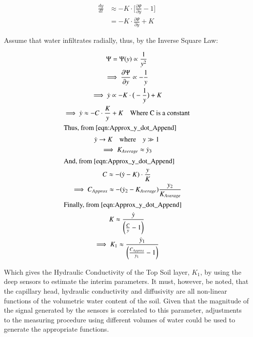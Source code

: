 \begin{align}
    \frac{dy}{dt} &\approx -K\cdot \bigg[\frac{\partial \Psi}{\partial y}-1\bigg]\\
    &= -K\cdot \frac{\partial \Psi}{\partial y} + K
\end{align}

Assume that water infiltrates radially, thus, by the Inverse Square Law:

\begin{gather}
    \Psi = \Psi(y) \propto \frac{1}{y^2}\\
    \implies \frac{\partial \Psi}{\partial y} \propto -\frac{1}{y} \\
    \implies \dot{y} \propto -K \cdot \big(-\frac{1}{y}\big) + K\\
    \implies \dot{y} \approx -C\cdot \frac{K}{y} + K \quad\text{Where C is a constant}\label{eqn:Approx_y_dot_Append}\\
    \intertext{Thus, from \ref{eqn:Approx_y_dot_Append}}
    \dot{y} \to K \quad\text{where}\quad y \gg 1\\
    \implies K_{Average} \approx \dot{y}_3\\
    \intertext{And, from \ref{eqn:Approx_y_dot_Append}}
    C \approx -(\dot{y}-K)\cdot\frac{y}{K}\\
    \implies C_{Approx} \approx -(\dot{y}_2 - K_{Average})\frac{y_2}{K_{Average}}\\
    \intertext{Finally, from \ref{eqn:Approx_y_dot_Append}}
     K \approx \frac{\dot{y}}{\bigg(\frac{C}{y}-1\bigg)}\\
    \implies K_1 \approx \frac{\dot{y}_1}{\bigg(\frac{C_{Approx}}{y_1}-1\bigg)}
\end{gather}

Which gives the Hydraulic Conductivity of the Top Soil layer, $K_1$, by using the deep sensors to estimate the interim parameters. It must, however, be noted, that the capillary head, hydraulic conductivity and diffusivity are all non-linear functions of the volumetric water content of the soil. Given that the magnitude of the signal generated by the sensors is correlated to this parameter, adjustments to the measuring procedure using different volumes of water could be used to generate the appropriate functions.














 

 